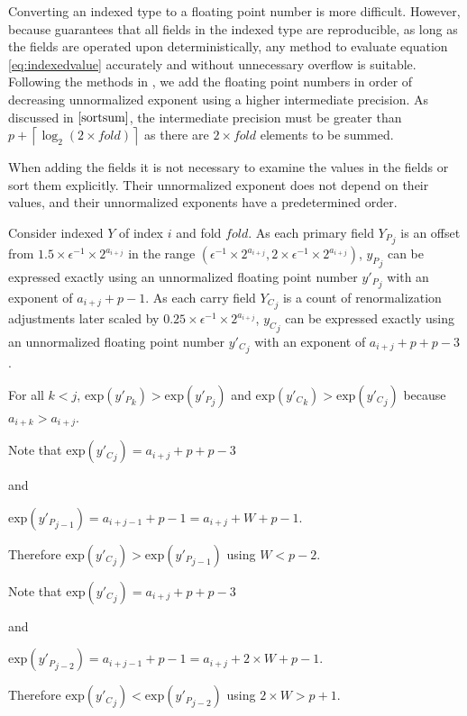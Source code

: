 \documentclass[12pt]{article}
\providecommand{\ceil}[1]{\left \lceil #1 \right \rceil }
\providecommand{\exp}{\ensuremath{\text{exp}}}
\theoremstyle{plain}
\begin{document}
    Converting an indexed type to a floating point number is more difficult. However, because \cite{repsum} guarantees that all fields in the indexed type are reproducible, as long as the fields are operated upon deterministically, any method to evaluate equation \ref{eq:indexedvalue} accurately and without unnecessary overflow is suitable. Following the methods in \cite{sortsum}, we add the floating point numbers in order of decreasing unnormalized exponent using a higher intermediate precision. As discussed in $\cite{sortsum}$, the intermediate precision must be greater than $p + \ceil{\log_2(2 \times fold)}$ as there are $2 \times fold$ elements to be summed.

    When adding the fields it is not necessary to examine the values in the fields or sort them explicitly. Their unnormalized exponent does not depend on their values, and their unnormalized exponents have a predetermined order.

    Consider indexed $Y$ of index $i$ and fold $fold$.
    As each primary field ${Y_P}_j$ is an offset from $1.5 \times \epsilon^{-1} \times 2^{a_{i + j}}$ in the range $(\epsilon^{-1} \times 2^{a_{i + j}}, 2 \times \epsilon^{-1} \times 2^{a_{i + j}})$, ${y_P}_j$ can be expressed exactly using an unnormalized floating point number ${y'_P}_j$ with an exponent of $a_{i + j} + p - 1$.
    As each carry field ${Y_C}_j$ is a count of renormalization adjustments later scaled by $0.25 \times \epsilon^{-1} \times 2^{a_{i + j}}$, ${y_C}_j$ can be expressed exactly using an unnormalized floating point number ${y'_C}_j$ with an exponent of $a_{i + j} + p + p - 3$.

    For all $k < j$, $\exp({y'_P}_k) > \exp({y'_P}_j)$ and $\exp({y'_C}_k) > \exp({y'_C}_j)$ because $a_{i + k} > a_{i + j}$.

    Note that $\exp({y'_C}_j) = a_{i + j} + p + p - 3$

    and

    $\exp({y'_P}_{j - 1}) = a_{i + j - 1} + p - 1 = a_{i + j} + W + p - 1$.

    Therefore $\exp({y'_C}_j) > \exp({y'_P}_{j - 1})$ using $W < p - 2$.

    Note that $\exp({y'_C}_j) = a_{i + j} + p + p - 3$

    and

    $\exp({y'_P}_{j - 2}) = a_{i + j - 1} + p - 1 = a_{i + j} + 2\times W + p - 1$.

    Therefore $\exp({y'_C}_j) < \exp({y'_P}_{j - 2})$ using $2 \times W > p + 1$.
\end{document}
